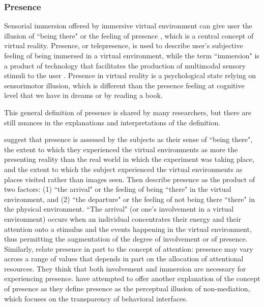 \subsubsection{Presence}
Sensorial immersion offered by immersive virtual environment can give user the illusion of ``being there" or the feeling of presence \citep{Heeter1992Presence}, which is a central concept of virtual reality. Presence, or telepresence, is used to describe user's subjective feeling of being immersed in a virtual environment, while the term ``immersion" is a product of technology that facilitates the production of multimodal sensory stimuli to the user \citep{Slater1994DepthPre, Bystrom1999Model}. Presence in virtual reality is a psychological state relying on sensorimotor illusion, which is different than the presence feeling at cognitive level that we have in dreams or by reading a book.

This general definition of presence is shared by many researchers, but there are still nuances in the explanations and interpretations of the definition.

\citet{Slater1994DepthPre} suggest that presence is assessed by the subjects as their sense of ``being there", the extent to which they experienced the virtual environments as more the presenting reality than the real world in which the experiment was taking place, and the extent to which the subject experienced the virtual environments as places visited rather than images seen. Then \citet{Kim1997Telepresence} describe presence as the product of two factors: (1) ``the arrival" or the feeling of being ``there" in the virtual environment, and (2) ``the departure" or the feeling of not being there ``there" in the physical environment. ``The arrival" (or one's involvement in a virtual environment) occurs when an individual concentrates their energy and their attention onto a stimulus and the events happening in the virtual environment, thus permitting the augmentation of the degree of involvement or of presence. Similarly, \citet{Witmer1998MPV} relate presence in part to the concept of attention: presence may vary across a range of values that depends in part on the allocation of attentional resources. They think that both involvement and immersion are necessary for experiencing presence. \citet{Lombard1997Heart} have attempted to offer another explanation of the concept of presence as they define presence as the perceptual illusion of non-mediation, which focuses on the transparency of behavioral interfaces.

